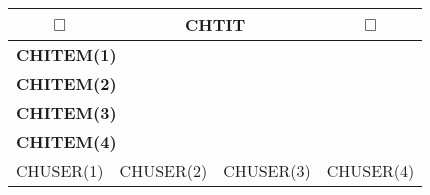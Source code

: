 


\begin{tabular}{|l|l|l|l|}
\hline
\multicolumn{1}{|c|}{$\Box$} & \multicolumn{2}{|c|}{\bf CHTIT} &
\multicolumn{1}{|c|}{$\Box$}  \\
\hline
 \multicolumn{4}{||l||}{\bf CHITEM(1)}  \\
\hline
  \multicolumn{4}{||l||}{\bf CHITEM(2)}  \\
\hline
  \multicolumn{4}{||l||}{\bf CHITEM(3)}  \\
\hline
  \multicolumn{4}{||l||}{\bf CHITEM(4)}  \\
\hline
{\tiny CHUSER(1)}&{\tiny CHUSER(2)}&{\tiny CHUSER(3)}&{\tiny CHUSER(4)}\\
\hline
\end{tabular}


